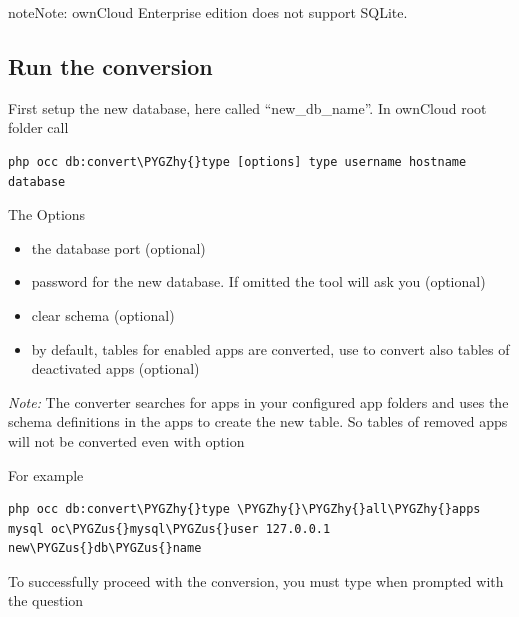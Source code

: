 \documentclass[letterpaper,10pt,english]{sphinxmanual}
\def\PYGZus{\char`\_}
\def\PYGZhy{\char`\-}
\begin{document}
\begin{notice}{note}{Note:}
ownCloud Enterprise edition does not support SQLite.
\end{notice}


\subsection{Run the conversion}
\label{configuration_database/db_conversion:run-the-conversion}
First setup the new database, here called ``new\_db\_name''.
In ownCloud root folder call

\begin{Verbatim}[commandchars=\\\{\}]
php occ db:convert\PYGZhy{}type [options] type username hostname database
\end{Verbatim}

The Options
\begin{itemize}
\item {} 
                       the database port (optional)

\item {} 
    password for the new database. If omitted the tool will ask you (optional)

\item {} 
                      clear schema (optional)

\item {} 
                          by default, tables for enabled apps are converted, use to convert also tables of deactivated apps (optional)

\end{itemize}

\emph{Note:} The converter searches for apps in your configured app folders and uses
the schema definitions in the apps to create the new table. So tables of removed
apps will not be converted even with option 

For example

\begin{Verbatim}[commandchars=\\\{\}]
php occ db:convert\PYGZhy{}type \PYGZhy{}\PYGZhy{}all\PYGZhy{}apps mysql oc\PYGZus{}mysql\PYGZus{}user 127.0.0.1 new\PYGZus{}db\PYGZus{}name
\end{Verbatim}

To successfully proceed with the conversion, you must type  when prompted
with the question 
\end{document}
